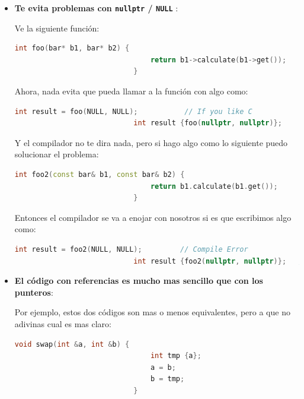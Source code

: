 \documentclass[12pt, fleqn]{report}                             %
\theoremstyle{break}                                            %
\newcommand{\textCode}[1]  { \texttt{#1} }                      %
\begin{document}
                \begin{itemize}
                    \item \textbf{Te evita problemas con \textCode{nullptr} / \textCode{NULL}}:

                        Ve la siguiente función:
                        \begin{lstlisting}[language=C++, gobble=28]
                            int foo(bar* b1, bar* b2) {
                                return b1->calculate(b1->get());
                            }
                        \end{lstlisting}

                        Ahora, nada evita que pueda llamar a la función con algo como:
                        \begin{lstlisting}[language=C++, gobble=28]
                            int result = foo(NULL, NULL);           // If you like C
                            int result {foo(nullptr, nullptr)};     // If you like C++
                        \end{lstlisting}

                        Y el compilador no te dira nada, pero si hago algo como lo siguiente puedo solucionar el
                        problema:
                        \begin{lstlisting}[language=C++, gobble=28]
                            int foo2(const bar& b1, const bar& b2) {
                                return b1.calculate(b1.get());
                            }
                        \end{lstlisting}

                        Entonces el compilador se va a enojar con nosotros si es que escribimos algo como:
                        \begin{lstlisting}[language=C++, gobble=28]
                            int result = foo2(NULL, NULL);         // Compile Error
                            int result {foo2(nullptr, nullptr)};   // Compile Error
                        \end{lstlisting}
                    
                    \item \textbf{El código con referencias es mucho mas sencillo que con los punteros}:

                        Por ejemplo, estos dos códigos son mas o menos equivalentes, pero a que no adivinas
                        cual es mas claro:
                        \begin{lstlisting}[language=C++, gobble=28]
                            void swap(int &a, int &b) {
                                int tmp {a};
                                a = b;
                                b = tmp;
                            }


\end{lstlisting}
\end{itemize}
\end{document}
